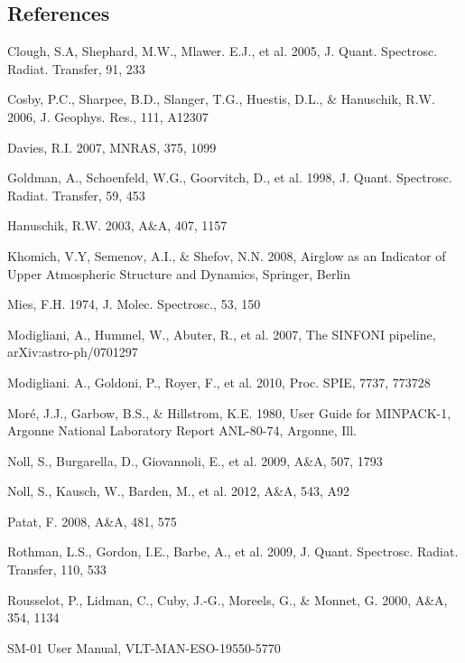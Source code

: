 \documentclass[a4paper,twoside,11pt]{article}
\begin{document}
\begin{thebibliography}{99}

\section*{{\hspace{-\leftmargin}}References}

Clough, S.A, Shephard, M.W., Mlawer. E.J., et al. 2005, J. Quant. Spectrosc.
Radiat. Transfer, 91, 233

Cosby, P.C., Sharpee, B.D., Slanger, T.G., Huestis, D.L., \& Hanuschik, R.W.
2006, J. Geophys. Res., 111, A12307

Davies, R.I. 2007, MNRAS, 375, 1099

Goldman, A., Schoenfeld, W.G., Goorvitch, D., et al. 1998, J. Quant. Spectrosc.
Radiat. Transfer, 59, 453

Hanuschik, R.W. 2003, A\&A, 407, 1157

Khomich, V.Y, Semenov, A.I., \& Shefov, N.N. 2008, Airglow as an Indicator of
Upper Atmospheric Structure and Dynamics, Springer, Berlin

Mies, F.H. 1974, J. Molec. Spectrosc., 53, 150

Modigliani, A., Hummel, W., Abuter, R., et al. 2007, The SINFONI pipeline,
arXiv:astro-ph/0701297

Modigliani. A., Goldoni, P., Royer, F., et al. 2010, Proc. SPIE, 7737, 773728

Mor\'e, J.J., Garbow, B.S., \& Hillstrom, K.E. 1980, User Guide for MINPACK-1,
Argonne National Laboratory Report ANL-80-74, Argonne, Ill.

Noll, S., Burgarella, D., Giovannoli, E., et al. 2009, A\&A, 507, 1793

Noll, S., Kausch, W., Barden, M., et al. 2012, A\&A, 543, A92

Patat, F. 2008, A\&A, 481, 575

Rothman, L.S., Gordon, I.E., Barbe, A., et al. 2009, J. Quant. Spectrosc.
Radiat. Transfer, 110, 533

Rousselot, P., Lidman, C., Cuby, J.-G., Moreels, G., \& Monnet, G. 2000, A\&A,
354, 1134

SM-01 User Manual, VLT-MAN-ESO-19550-5770\\[0.5cm]


\end{thebibliography}
\end{document}
